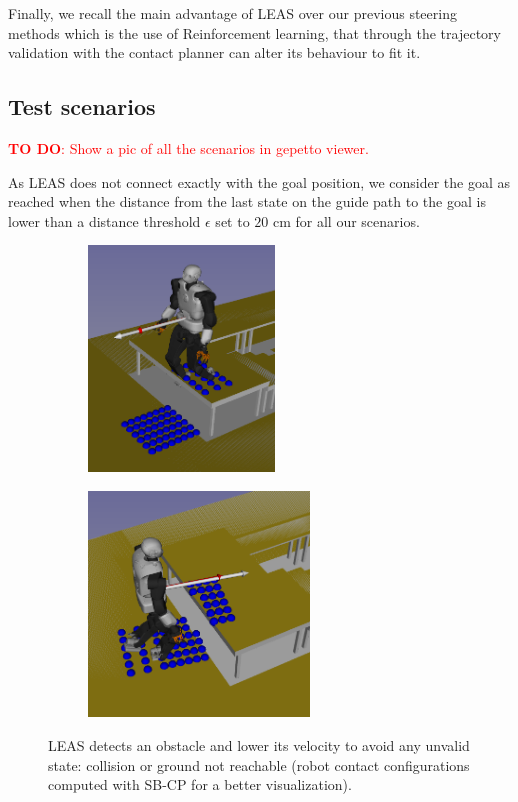 Finally, we recall the main advantage of LEAS over our previous steering methods which is the use of Reinforcement learning, that through the trajectory validation with the contact planner can alter its behaviour to fit it.

\subsection{Test scenarios\label{subsub:leas:test_scenarios}}

\textcolor{red}{\textbf{TO DO}: Show a pic of all the scenarios in gepetto viewer.}

As LEAS does not connect exactly with the goal position, we consider the goal as reached when the distance from the last state on the guide path to the goal is lower than a distance threshold $\epsilon$ set to $20$ cm for all our scenarios.


\begin{figure}
    \centering
    \captionsetup[subfigure]{justification=centering}
    \begin{subfigure}[t]{0.43\linewidth}
    \includegraphics[width=\textwidth,height=6cm]{Figures/Chapter_LEAS/stop_bauzil_0.png}
    \end{subfigure}
    \begin{subfigure}[t]{0.43\linewidth}
    \includegraphics[width=\textwidth,height=6cm]{Figures/Chapter_LEAS/stop_bauzil_1.png}
    \end{subfigure}
    \label{fig:leas_stop_void_obstacle}
    \caption{LEAS detects an obstacle and lower its velocity to avoid any unvalid state: collision or ground not reachable (robot contact configurations computed with SB-CP for a better visualization).}
\end{figure}

